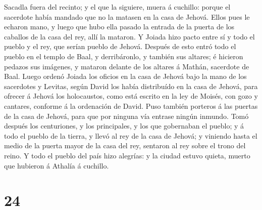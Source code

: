 Sacadla fuera del recinto; y el que la siguiere, muera á cuchillo:
porque el sacerdote había mandado que no la matasen en la casa de
Jehová.  Ellos pues le echaron mano, y luego que hubo ella
pasado la entrada de la puerta de los caballos de la casa del rey, allí
la mataron.  Y Joiada hizo pacto entre sí y todo el pueblo
y el rey, que serían pueblo de Jehová.  Después de esto
entró todo el pueblo en el templo de Baal, y derribáronlo, y también sus
altares; é hicieron pedazos sus imágenes, y mataron delante de los
altares á Mathán, sacerdote de Baal.  Luego ordenó Joiada
los oficios en la casa de Jehová bajo la mano de los sacerdotes y
Levitas, según David los había distribuído en la casa de Jehová, para
ofrecer á Jehová los holocaustos, como está escrito en la ley de Moisés,
con gozo y cantares, conforme á la ordenación de David. 
Puso también porteros á las puertas de la casa de Jehová, para que por
ninguna vía entrase ningún inmundo.  Tomó después los
centuriones, y los principales, y los que gobernaban el pueblo; y á todo
el pueblo de la tierra, y llevó al rey de la casa de Jehová; y viniendo
hasta el medio de la puerta mayor de la casa del rey, sentaron al rey
sobre el trono del reino.  Y todo el pueblo del país hizo
alegrías: y la ciudad estuvo quieta, muerto que hubieron á Athalía á
cuchillo.

\hypertarget{section-23}{%
\section{24}\label{section-23}}

